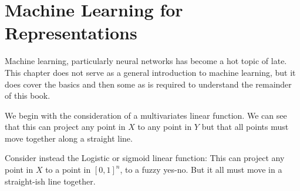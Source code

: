 \documentclass[12pt,parskip]{komatufte}
\begin{document}
	

\chapter{Machine Learning for Representations}\label{sec:machine-learning-for-representations}


Machine learning, particularly neural networks has become a hot topic of late.
This chapter does not serve as a general introduction to machine learning,
but it does cover the basics and then some as is required to understand the remainder of this book.


We begin with the consideration of a multivariates linear function.
We can see that this can project any point in $X$ to any point in $Y$ but that all points must move together along a straight line.

Consider instead the Logistic or sigmoid linear function:
This can project any point in $X$ to a point in $[0,1]^n$,
to a fuzzy yes-no.
But it all must move in a straight-ish line together.
\end{document}
